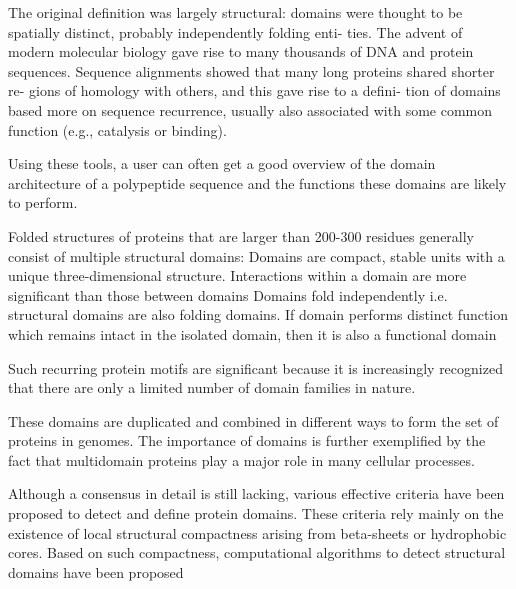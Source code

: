 The original definition was largely structural: domains were thought
to be spatially distinct, probably independently folding enti-
ties. The advent of modern molecular biology gave rise to
many thousands of DNA and protein sequences. Sequence
alignments showed that many long proteins shared shorter re-
gions of homology with others, and this gave rise to a defini-
tion of domains based more on sequence recurrence, usually
also associated with some common function (e.g., catalysis
or binding). 

Using these
tools, a user can often get a good overview of the domain
architecture of a polypeptide sequence and the functions these
domains are likely to perform.




Folded structures of proteins that are larger than 200-300 residues generally consist of multiple structural domains:
Domains are compact, stable units with a unique three-dimensional structure. 
Interactions within a domain are more significant than those between domains
Domains fold independently i.e. structural domains are also folding domains. If domain performs distinct function which remains intact in the isolated domain, then it is also a functional domain




Such recurring protein motifs are significant because it is increasingly recognized that there are only a limited number of domain families in nature.









These domains are duplicated and combined in different ways to form the set of proteins in genomes. 
The importance of domains is further exemplified by the fact that multidomain proteins play a major role in many cellular processes.

Although a consensus in detail is still lacking, various effective criteria have been proposed to detect and define protein domains.
These criteria rely mainly on the existence of local structural compactness arising from beta-sheets or hydrophobic cores. 
Based on such compactness, computational algorithms to detect structural domains have been proposed








